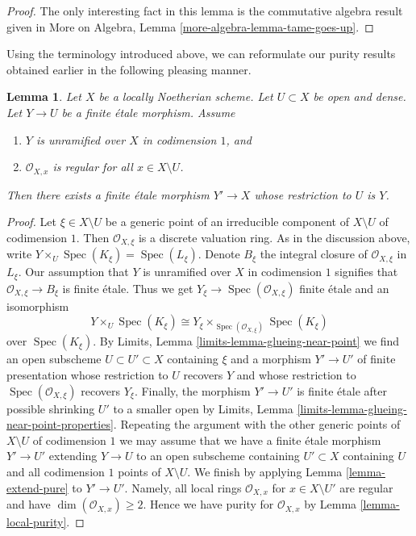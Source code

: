 \documentclass{stacks-project}
\theoremstyle{plain}
\newtheorem{lemma}[subsection]{Lemma}
\theoremstyle{definition}
\theoremstyle{remark}
\numberwithin{equation}{subsection}
\def\Spec{\mathop{\mathrm{Spec}}}
\begin{document}
\begin{proof}
The only interesting fact in this lemma is the commutative algebra
result given in More on Algebra, Lemma \ref{more-algebra-lemma-tame-goes-up}.
\end{proof}

\noindent
Using the terminology introduced above, we can reformulate our
purity results obtained earlier in the following pleasing manner.

\begin{lemma}
\label{lemma-purity-one-divisor-general}
Let $X$ be a locally Noetherian scheme. Let $U \subset X$ be open and dense.
Let $Y \to U$ be a finite \'etale morphism. Assume
\begin{enumerate}
\item $Y$ is unramified over $X$ in codimension $1$, and
\item $\mathcal{O}_{X, x}$ is regular for all $x \in X \setminus U$.
\end{enumerate}
Then there exists a finite \'etale morphism $Y' \to X$
whose restriction to $U$ is $Y$.
\end{lemma}

\begin{proof}
Let $\xi \in X \setminus U$ be a generic point of an irreducible component
of $X \setminus U$ of codimension $1$. Then $\mathcal{O}_{X, \xi}$ is a
discrete valuation ring. As in the discussion above, write
$Y \times_U \Spec(K_\xi) = \Spec(L_\xi)$.
Denote $B_\xi$ the integral closure of $\mathcal{O}_{X, \xi}$ in
$L_\xi$. Our assumption that $Y$ is unramified over $X$ in codimension $1$
signifies that $\mathcal{O}_{X, \xi} \to B_\xi$ is finite \'etale.
Thus we get $Y_\xi \to \Spec(\mathcal{O}_{X, \xi})$ finite
\'etale and an isomorphism
$$
Y \times_U \Spec(K_\xi) \cong
Y_\xi \times_{\Spec(\mathcal{O}_{X, \xi})} \Spec(K_\xi)
$$
over $\Spec(K_\xi)$.
By Limits, Lemma \ref{limits-lemma-glueing-near-point}
we find an open subscheme $U \subset U' \subset X$
containing $\xi$ and a morphism $Y' \to U'$ of finite presentation
whose restriction to $U$ recovers $Y$ and
whose restriction to $\Spec(\mathcal{O}_{X, \xi})$ recovers $Y_\xi$.
Finally, the morphism $Y' \to U'$ is finite \'etale
after possible shrinking $U'$ to a smaller open by
Limits, Lemma \ref{limits-lemma-glueing-near-point-properties}.
Repeating the argument with the other generic points of
$X \setminus U$ of codimension $1$ we may assume that we have
a finite \'etale morphism $Y' \to U'$ extending $Y \to U$
to an open subscheme containing $U' \subset X$ containing $U$
and all codimension $1$ points of $X \setminus U$.
We finish by applying Lemma \ref{lemma-extend-pure}
to $Y' \to U'$. Namely, all local rings $\mathcal{O}_{X, x}$
for $x \in X \setminus U'$ are regular and
have $\dim(\mathcal{O}_{X, x}) \geq 2$. Hence we have
purity for $\mathcal{O}_{X, x}$ by Lemma \ref{lemma-local-purity}.
\end{proof}
\end{document}
